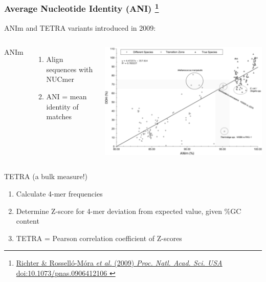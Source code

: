 %
\begin{frame}
  \frametitle{Average Nucleotide Identity (ANI)
  \footnote{\tiny{\href{http://dx.doi.org/10.1073/pnas.0906412106
}{Richter \& Rossell\'{o}-M\'{o}ra \textit{et al.} (2009) \textit{Proc. Natl. Acad. Sci. USA} doi:10.1073/pnas.0906412106
}}}
  }
  ANIm and TETRA variants introduced in 2009:
  \begin{columns}[T] 
      \textcolor{RawSienna}{ANIm}
      \begin{enumerate}
        \item \textcolor{hutton_green}{Align sequences with NUCmer}
        \item \textcolor{hutton_purple}{ANI = mean identity of matches}
      \end{enumerate}
      \includegraphics[width=\textwidth]{images/anim_ddh_equiv}
  \end{columns}    
  \textcolor{RawSienna}{TETRA} (a bulk measure!)
  \begin{enumerate}
    \item \textcolor{hutton_green}{Calculate 4-mer frequencies}
    \item \textcolor{hutton_blue}{Determine Z-score for 4-mer deviation from expected value, given \%GC content}
    \item \textcolor{hutton_purple}{TETRA = Pearson correlation coefficient of Z-scores}
  \end{enumerate}
\end{frame}

